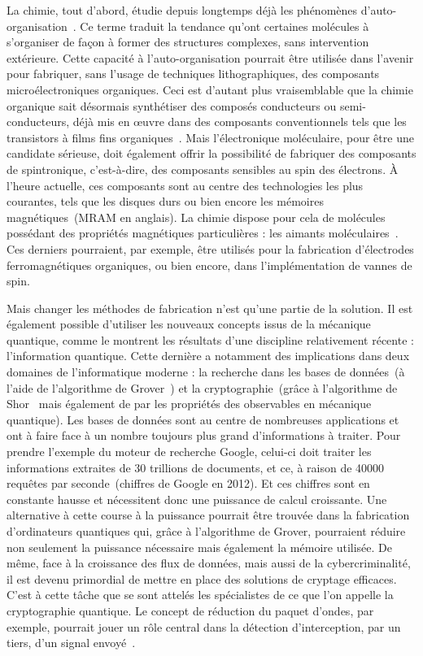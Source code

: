 La chimie, tout d'abord, étudie depuis longtemps déjà les phénomènes d'auto-organisation~\cite{Lehn1988,Lehn1996}. Ce terme traduit la tendance qu'ont certaines molécules à s'organiser de façon à former des structures complexes, sans intervention extérieure. Cette capacité à l'auto-organisation pourrait être utilisée dans l'avenir pour fabriquer, sans l'usage de techniques lithographiques, des composants microélectroniques organiques. Ceci est d'autant plus vraisemblable que la chimie organique sait désormais synthétiser des composés conducteurs ou semi-conducteurs, déjà mis en œuvre dans des composants conventionnels tels que les transistors à films fins organiques~\cite{Horowitz1990,Lin1997,Klauk2007}. Mais l'électronique moléculaire, pour être une candidate sérieuse, doit également offrir la possibilité de fabriquer des composants de spintronique, c'est-à-dire, des composants sensibles au spin des électrons. À l'heure actuelle, ces composants sont au centre des technologies les plus courantes, tels que les disques durs ou bien encore les mémoires magnétiques~(MRAM en anglais). La chimie dispose pour cela de molécules possédant des propriétés magnétiques particulières : les aimants moléculaires~\cite{Gatteschi2006}. Ces derniers pourraient, par exemple, \^etre utilisés pour la fabrication d'électrodes ferromagnétiques organiques, ou bien encore, dans l'implémentation de vannes de spin.

Mais changer les méthodes de fabrication n'est qu'une partie de la solution. Il est également possible d'utiliser les nouveaux concepts issus de la mécanique quantique, comme le montrent les résultats d'une discipline relativement récente : l'information quantique. Cette dernière a notamment des implications dans deux domaines de l'informatique moderne : la recherche dans les bases de données~(à l'aide de l’algorithme de Grover~\cite{Grover2001}) et la cryptographie~(grâce à l'algorithme de Shor~\cite{Vandersypen2001} mais également de par les propriétés des observables en mécanique quantique). Les bases de données sont au centre de nombreuses applications et ont à faire face à un nombre toujours plus grand d'informations à traiter. Pour prendre l'exemple du moteur de recherche Google, celui-ci doit traiter les informations extraites de 30 trillions de documents, et ce, à raison de 40000 requêtes par seconde~(chiffres de Google en 2012). Et ces chiffres sont en constante hausse et nécessitent donc une puissance de calcul croissante. Une alternative à cette course à la puissance pourrait être trouvée dans la fabrication d'ordinateurs quantiques qui, grâce à l'algorithme de Grover, pourraient réduire non seulement la puissance nécessaire mais également la mémoire utilisée. De m\^eme, face à la croissance des flux de données, mais aussi de la cybercriminalité, il est devenu primordial de mettre en place des solutions de cryptage efficaces. C'est à cette t\^ache que se sont attelés les spécialistes de ce que l’on appelle la cryptographie quantique. Le concept de réduction du paquet d'ondes, par exemple, pourrait jouer un rôle central dans la détection d'interception, par un tiers, d'un signal envoyé~\cite{Bennett1992}.

